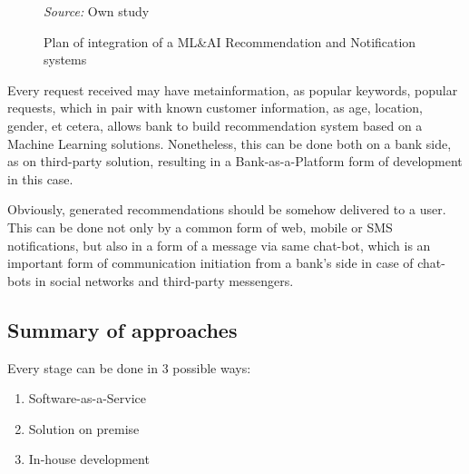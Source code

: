 \begin{figure}
    \centering
    \caption{Plan of integration of a ML\&AI Recommendation and Notification systems}
    \medskip
    \footnotesize\textit{Source:} Own study
\end{figure}

Every request received may have metainformation, as popular keywords, popular requests, which in pair with known customer information, as age, location, gender, et cetera, allows bank to build recommendation system based on a Machine Learning solutions.
Nonetheless, this can be done both on a bank side, as on third-party solution, resulting in a Bank-as-a-Platform form of development in this case.

Obviously, generated recommendations should be somehow delivered to a user.
This can be done not only by a common form of web, mobile or SMS notifications, but also in a form of a message via same chat-bot, which is an important form of communication initiation from a bank's side in case of chat-bots in social networks and third-party messengers.

\subsection{Summary of approaches}

Every stage can be done in 3 possible ways:
\begin{enumerate}
    \item Software-as-a-Service
    \item Solution on premise
    \item In-house development
\end{enumerate}


